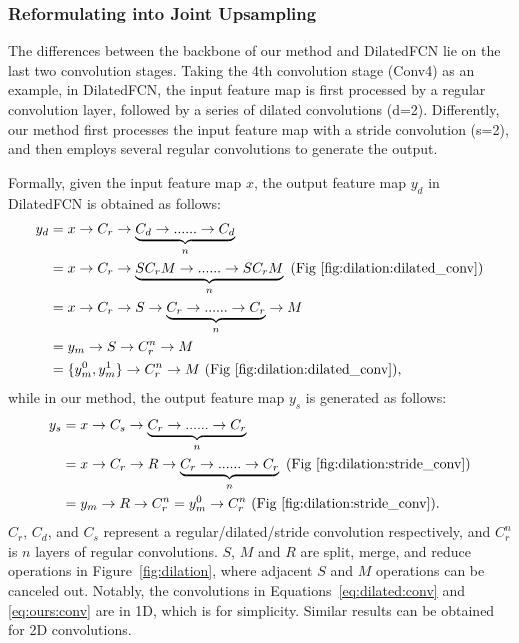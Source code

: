 \documentclass[10pt,twocolumn,letterpaper]{article}
\begin{document}
\subsubsection{Reformulating into Joint Upsampling}
\quad The differences between the backbone of our method and DilatedFCN lie on the last two convolution stages.
Taking the 4th convolution stage (Conv4) as an example, in DilatedFCN, the input feature map is first processed by a regular convolution layer, followed by a series of dilated convolutions (d=2).
Differently, our method first processes the input feature map with a stride convolution (s=2), and then employs several regular convolutions to generate the output.

Formally, given the input feature map $x$, the output feature map $y_{d}$ in DilatedFCN is obtained as follows:
\begin{equation}
	\begin{aligned}
		y_d &= x\to C_r \to \underbrace{C_d\to ...... \to C_d}_{n} \\
		    &= x\to C_r \to \underbrace{SC_rM\to ...... \to SC_rM}_{n}~\text{(Fig~\ref{fig:dilation:dilated_conv})}\\
		    &= x\to C_r \to S \to \underbrace{C_r\to ...... \to C_r}_{n}\to M \\
		    &= y_m \to S \to C_r^n \to M\\
		    &= \{y_m^{0}, y_m^{1}\}\to C_r^n \to M~\text{(Fig~\ref{fig:dilation:dilated_conv})},
	\end{aligned}
	\label{eq:dilated:conv}
\end{equation}
while in our method, the output feature map $y_{s}$ is generated as follows:
\begin{equation}
	\begin{aligned}
		y_s &= x\to C_s \to \underbrace{C_r\to ...... \to C_r}_{n}\\
		    &= x\to C_r \to R \to \underbrace{C_r\to ...... \to C_r}_{n}~\text{(Fig~\ref{fig:dilation:stride_conv})}\\
		    &= y_m \to R \to C_r^n = y_m^{0}\to C_r^n~\text{(Fig~\ref{fig:dilation:stride_conv})}.
	\end{aligned}
	\label{eq:ours:conv}
\end{equation}
$C_r$, $C_d$, and $C_s$ represent a regular/dilated/stride convolution respectively, and $C_r^n$ is $n$ layers of regular convolutions.
$S$, $M$ and $R$ are split, merge, and reduce operations in Figure~\ref{fig:dilation}, where adjacent $S$ and $M$ operations can be canceled out.
Notably, the convolutions in Equations~\ref{eq:dilated:conv} and \ref{eq:ours:conv} are in 1D, which is for simplicity.
Similar results can be obtained for 2D convolutions.
\end{document}
